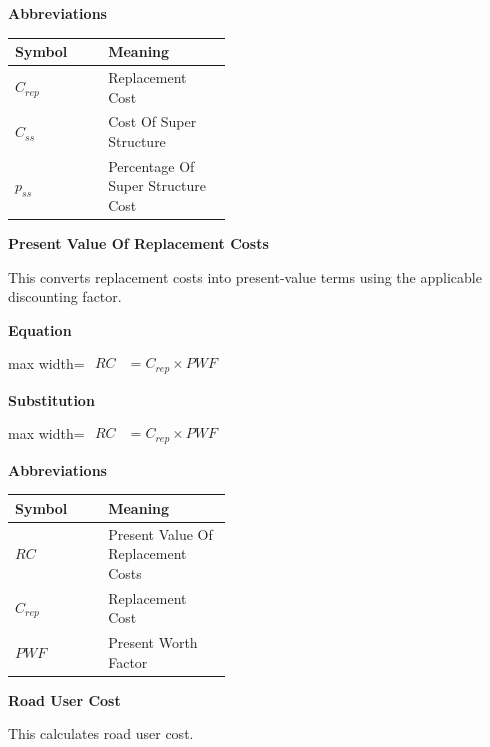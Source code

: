 \documentclass{article}
\begin{document}
\textbf{Abbreviations}\par\vspace{-0.35em}
\begin{tabularx}{\linewidth}{>{\raggedright\arraybackslash}p{0.43\linewidth} >{\raggedright\arraybackslash}X}
\toprule
Symbol & Meaning \\
\midrule
$C_{rep}$ & Replacement Cost \\
$C_{ss}$ & Cost Of Super Structure \\
$p_{ss}$ & Percentage Of Super Structure Cost \\
\bottomrule
\end{tabularx}
\vspace{0.6em}
\vspace{0.4em}
\textbf{Present Value Of Replacement Costs}\par\vspace{-0.35em}
This converts replacement costs into present-value terms using the applicable discounting factor.

\vspace{0.4em}
\textbf{Equation}\par\vspace{-0.35em}
\begin{center}
\begin{adjustbox}{max width=\linewidth}
$\displaystyle\begin{aligned}
RC &= C_{rep} \times PWF
\end{aligned}$
\end{adjustbox}
\end{center}
\vspace{0.4em}
\textbf{Substitution}\par\vspace{-0.35em}
\begin{center}
\begin{adjustbox}{max width=\linewidth}
$\displaystyle\begin{aligned}
RC &= C_{rep} \times PWF
\end{aligned}$
\end{adjustbox}
\end{center}
\vspace{0.4em}
\textbf{Abbreviations}\par\vspace{-0.35em}
\begin{tabularx}{\linewidth}{>{\raggedright\arraybackslash}p{0.43\linewidth} >{\raggedright\arraybackslash}X}
\toprule
Symbol & Meaning \\
\midrule
$RC$ & Present Value Of Replacement Costs \\
$C_{rep}$ & Replacement Cost \\
$PWF$ & Present Worth Factor \\
\bottomrule
\end{tabularx}
\vspace{0.6em}
\vspace{0.4em}
\textbf{Road User Cost}\par\vspace{-0.35em}
This calculates road user cost.
\end{document}
